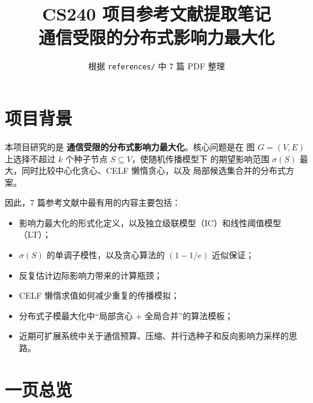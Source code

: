 \documentclass[UTF8,10pt]{ctexart}
\title{\textbf{CS240 项目参考文献提取笔记}\\
通信受限的分布式影响力最大化}
\author{根据 \texttt{references/} 中 7 篇 PDF 整理}
\date{}
\begin{document}
\maketitle

\section{项目背景}

本项目研究的是 \textbf{通信受限的分布式影响力最大化}。核心问题是在
图 $G=(V,E)$ 上选择不超过 $k$ 个种子节点 $S\subseteq V$，使随机传播模型下
的期望影响范围 $\sigma(S)$ 最大，同时比较中心化贪心、CELF 懒惰贪心，以及
局部候选集合并的分布式方案。

因此，7 篇参考文献中最有用的内容主要包括：
\begin{itemize}
\item 影响力最大化的形式化定义，以及独立级联模型（IC）和线性阈值模型（LT）；
\item $\sigma(S)$ 的单调子模性，以及贪心算法的 $(1-1/e)$ 近似保证；
\item 反复估计边际影响力带来的计算瓶颈；
\item CELF 懒惰求值如何减少重复的传播模拟；
\item 分布式子模最大化中“局部贪心 + 全局合并”的算法模板；
\item 近期可扩展系统中关于通信预算、压缩、并行选种子和反向影响力采样的思路。
\end{itemize}

\section{一页总览}
\end{document}
